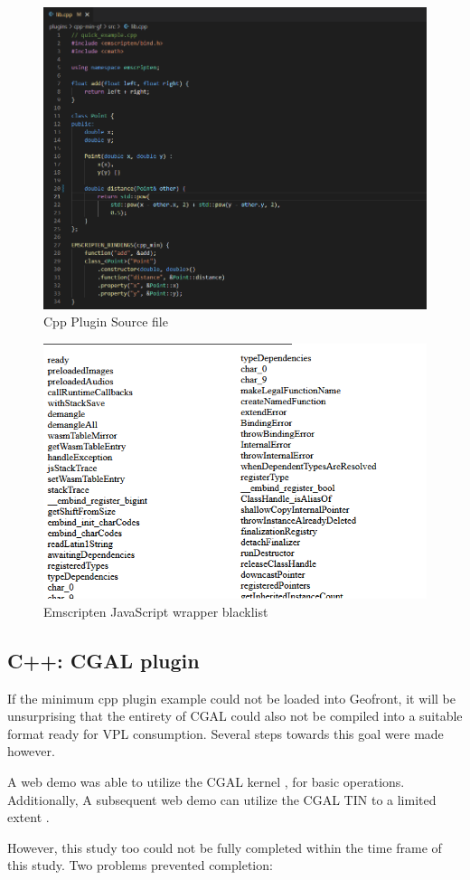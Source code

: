 \begin{figure}
  \graphicspath{{../../assets/images/6.1.3/}}
  \centering
  \includegraphics[width=0.50\linewidth]{source.PNG}
  \caption[loading a plugin]{Cpp Plugin Source file}
  \label{fig:min-cpp-source}
\end{figure}

\begin{figure}
  \graphicspath{{../../assets/images/6.1.3/}}
  \centering
  \includegraphics[width=0.50\linewidth]{blacklist.PNG}
  \caption[loading a plugin]{Emscripten JavaScript wrapper blacklist }
  \label{fig:min-cpp-whitelist}
\end{figure}

\subsection{C++: CGAL plugin}

If the minimum cpp plugin example could not be loaded into Geofront, it will be unsurprising that the entirety of CGAL could also not be compiled into a suitable format ready for VPL consumption.
Several steps towards this goal were made however.

A web demo was able to utilize the CGAL kernel , for basic operations. 
Additionally, A subsequent web demo can utilize the CGAL TIN to a limited extent .

However, this study too could not be fully completed within the time frame of this study. 
Two problems prevented completion:

